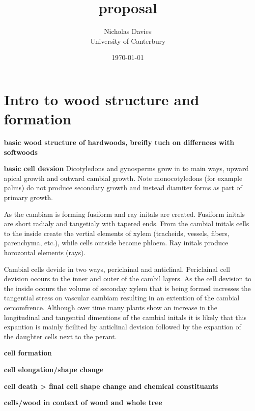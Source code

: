 \documentclass{article}
\begin{document}
\title{proposal}

\author{Nicholas Davies\\ University of Canterbury }

\date{\today}



\maketitle




\section{Intro to wood structure and formation}
\textbf{basic wood structure of hardwoods, breifly tuch on differnces with softwoods}

\textbf{basic cell devsion}
Dicotyledons and gynosperms grow in to main ways, upward apical growth and outward cambial growth. Note monocotyledons (for example palms) do not produce secondary growth and instead diamiter forms as part of primary growth.

As the cambiam is forming fusiform and ray initals are created. Fusiform initals are short radialy and tangetialy with tapered ends. From the cambial initals cells to the inside create the vertial elements of xylem (tracheids, vessels, fibers, parenchyma, etc.), while cells outside become phloem. Ray initals produce horozontal elements (rays).

Cambial cells devide in two ways, periclainal and anticlinal. Periclainal cell devision ocours to the inner and outer of the cambil layers. As the cell devision to the inside ocours the volume of seconday xylem that is being formed incresses the tangential stress on vascular cambiam resulting in an extention of the cambial cercomfrence. Although over time many plants show an increase in the longitudinal and tangential dimentions of the cambial initals it is likely that this expantion is mainly ficilited by anticlinal devision followed by the expantion of the daughter cells next to the perant.

\textbf{cell formation}

\textbf{cell elongation/shape change}

\textbf{cell death > final cell shape change and chemical constituants}

\textbf{cells/wood in context of wood and whole tree}
\end{document}
